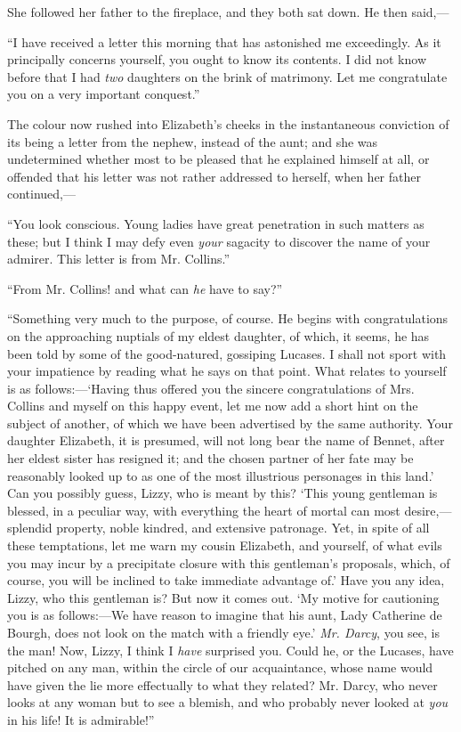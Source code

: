She followed her father to the fireplace, and they both sat down. He then said,---

``I have received a letter this morning that has astonished me exceedingly. As it principally concerns yourself, you ought to know its contents. I did not know before that I had \textit{two} daughters on the brink of matrimony. Let me congratulate you on a very important conquest.''

The colour now rushed into Elizabeth's cheeks in the instantaneous conviction of its being a letter from the nephew, instead of the aunt; and she was undetermined whether most to be pleased that he explained himself at all, or offended that his letter was not rather addressed to herself, when her father continued,---

``You look conscious. Young ladies have great penetration in such matters as these; but I think I may defy even \textit{your} sagacity to discover the name of your admirer. This letter is from Mr. Collins.''

``From Mr. Collins! and what can \textit{he} have to say?''

``Something very much to the purpose, of course. He begins with congratulations on the approaching nuptials of my eldest daughter, of which, it seems, he has been told by some of the good-natured, gossiping Lucases. I shall not sport with your impatience by reading what he says on that point. What relates to yourself is as follows:---`Having thus offered you the sincere congratulations of Mrs. Collins and myself on this happy event, let me now add a short hint on the subject of another, of which we have been advertised by the same authority. Your daughter Elizabeth, it is presumed, will not long bear the name of Bennet, after her eldest sister has resigned it; and the chosen partner of her fate may be reasonably looked up to as one of the most illustrious personages in this land.' Can you possibly guess, Lizzy, who is meant by this? `This young gentleman is blessed, in a peculiar way, with everything the heart of mortal can most desire,---splendid property, noble kindred, and extensive patronage. Yet, in spite of all these temptations, let me warn my cousin Elizabeth, and yourself, of what evils you may incur by a precipitate closure with this gentleman's proposals, which, of course, you will be inclined to take immediate advantage of.' Have you any idea, Lizzy, who this gentleman is? But now it comes out. `My motive for cautioning you is as follows:---We have reason to imagine that his aunt, Lady Catherine de Bourgh, does not look on the match with a friendly eye.' \textit{Mr. Darcy}, you see, is the man! Now, Lizzy, I think I \textit{have} surprised you. Could he, or the Lucases, have pitched on any man, within the circle of our acquaintance, whose name would have given the lie more effectually to what they related? Mr. Darcy, who never looks at any woman but to see a blemish, and who probably never looked at \textit{you} in his life! It is admirable!''

